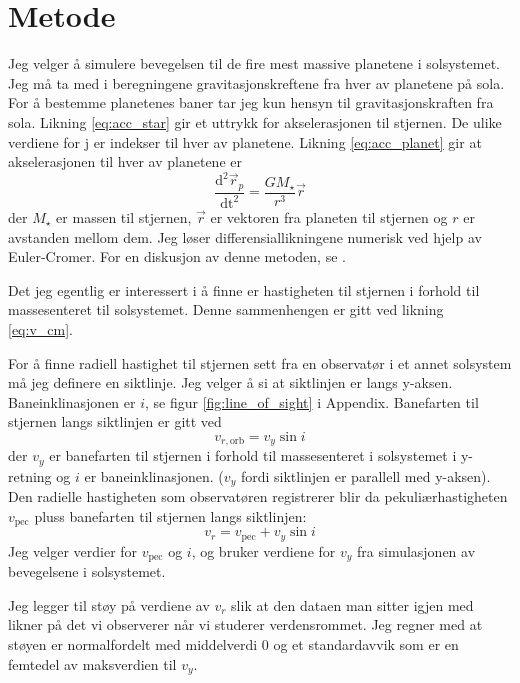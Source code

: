 \documentclass[reprint, english,notitlepage]{revtex4-1}  %
\begin{document}
\section{Metode}

Jeg velger å simulere bevegelsen til de fire mest massive planetene i solsystemet. Jeg må ta med
 i beregningene gravitasjonskreftene fra hver av planetene på sola. For å bestemme planetenes baner tar jeg kun hensyn til gravitasjonskraften fra sola. Likning \ref{eq:acc_star} gir et uttrykk for akselerasjonen til stjernen. De ulike verdiene for j er indekser til hver av planetene. Likning \ref{eq:acc_planet} gir at akselerasjonen til hver av planetene er
 \begin{equation*}
   \frac{\mathrm{d}^2 \vec{r}_p}{\mathrm{dt}^2} = \frac{G M_{\star}}{r^3} \vec{r}
 \end{equation*}
 der $M_{\star}$ er massen til stjernen, $\vec{r}$ er vektoren fra planeten til stjernen og $r$ er avstanden mellom dem. Jeg løser differensiallikningene numerisk ved hjelp av Euler-Cromer. For en diskusjon av denne metoden, se \citep{paper1B}.

Det jeg egentlig er interessert i å finne er hastigheten til stjernen i forhold til
 massesenteret til solsystemet. Denne sammenhengen er gitt ved likning \ref{eq:v_cm}.

For å finne radiell hastighet til stjernen sett fra en observatør i et annet solsystem må jeg
 definere en siktlinje. Jeg velger å si at siktlinjen er langs y-aksen. Baneinklinasjonen er $i$, se figur \ref{fig:line_of_sight} i Appendix. Banefarten til stjernen langs siktlinjen er gitt ved \[v_{r, \text{orb}} = v_y \sin{i}\] der $v_y$ er banefarten til stjernen i forhold til massesenteret i solsystemet i y-retning og $i$ er baneinklinasjonen. ($v_y$ fordi siktlinjen er parallell med y-aksen). Den radielle hastigheten som observatøren registrerer blir da pekuliærhastigheten $v_{\text{pec}}$ pluss banefarten til stjernen langs siktlinjen:
 \begin{equation}
   \label{eq:v_r}
   v_r = v_{\text{pec}} + v_y \sin{i}
 \end{equation}
 Jeg velger verdier for $v_{\text{pec}}$ og $i$, og bruker verdiene for $v_y$ fra simulasjonen av
 bevegelsene i solsystemet.

Jeg legger til støy på verdiene av $v_r$ slik at den dataen man sitter igjen med likner på det vi observerer når vi studerer verdensrommet. Jeg regner med at støyen er normalfordelt med middelverdi 0 og et standardavvik som er en femtedel av maksverdien til $v_y$.
\end{document}
